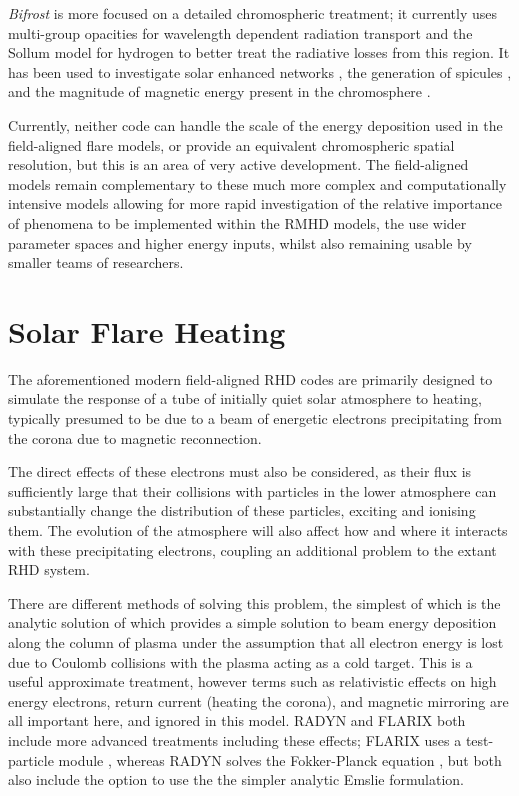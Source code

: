 \textit{Bifrost} is more focused on a detailed chromospheric treatment; it currently uses multi-group opacities for wavelength dependent radiation transport and the Sollum model for hydrogen \NeedRef{} to better treat the radiative losses from this region.
It has been used to investigate solar enhanced networks \citep{Carlsson2016}, the generation of spicules \citep{Martinez-Sykora2017}, and the magnitude of magnetic energy present in the chromosphere \citep{Martinez-Sykora2019} .

Currently, neither code can handle the scale of the energy deposition used in the field-aligned flare models, or provide an equivalent chromospheric spatial resolution, but this is an area of very active development.
The field-aligned models remain complementary to these much more complex and computationally intensive models allowing for more rapid investigation of the relative importance of phenomena to be implemented within the RMHD models, the use wider parameter spaces and higher energy inputs, whilst also remaining usable by smaller teams of researchers.


\section{Solar Flare Heating}

The aforementioned modern field-aligned RHD codes are primarily designed to simulate the response of a tube of initially quiet solar atmosphere to heating, typically presumed to be due to a beam of energetic electrons precipitating from the corona due to magnetic reconnection.

The direct effects of these electrons must also be considered, as their flux is sufficiently large that their collisions with particles in the lower atmosphere can substantially change the distribution of these particles, exciting and ionising them.
The evolution of the atmosphere will also affect how and where it interacts with these precipitating electrons, coupling an additional problem to the extant RHD system.

There are different methods of solving this problem, the simplest of which is the analytic solution of \citet{Emslie1978} which provides a simple solution to beam energy deposition along the column of plasma under the assumption that all electron energy is lost due to Coulomb collisions with the plasma acting as a cold target.
This is a useful approximate treatment, however terms such as relativistic effects on high energy electrons, return current (heating the corona), and magnetic mirroring are all important here, and ignored in this model. RADYN and FLARIX both include more advanced treatments including these effects; FLARIX uses a test-particle module \NeedRef{}, whereas RADYN solves the Fokker-Planck equation \citep[e.g.][]{Hamilton1990}, but both also include the option to use the the simpler analytic Emslie formulation.

